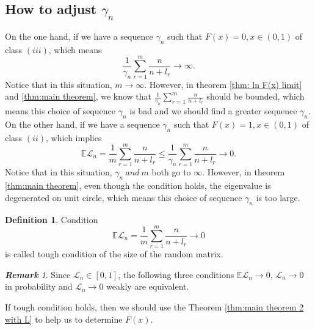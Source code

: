 \documentclass[12pt]{article}
\theoremstyle{plain}
\theoremstyle{definition}
\newtheorem{dfn}{\textbf{Definition}}
\theoremstyle{remark}
\newtheorem{rem}{\textbf{Remark}}
\begin{document}
\subsection*{How to adjust $\gamma_n$}
On the one hand, if we have a sequence $\gamma_{n}$ such that $F(x)=0,x\in(0,1)$ of class $(iii)$, which means
\begin{equation*}
\frac{1}{\gamma_{n}} \sum_{r=1}^{m} \frac{n}{n+l_{r}} \rightarrow \infty.
\end{equation*}
Notice that in this situation, $m\rightarrow \infty$.
However, in theorem \ref{thm: ln F(x) limit} and \ref{thm:main theorem}, we know that $\frac{1}{\gamma_{n}} \sum_{r=1}^{m} \frac{n}{n+l_{r}}$ should be bounded, which means this choice of sequence $\gamma_{n}$ is bad and we should find a greater sequence $\gamma_{n}$.\\
On the other hand, if we have a sequence $\gamma_{n}$ such that $F(x)=1,x\in(0,1)$ of class $(ii)$, which implies
\begin{equation*}
    \mathbb{E} \mathscr{L}_{n}=\frac{1}{m} \sum_{r=1}^{m} \frac{n}{n+l_{r}}\leq \frac{1}{\gamma_{n}} \sum_{r=1}^{m} \frac{n}{n+l_{r}} \rightarrow  0.
\end{equation*}
Notice that in this situation, $\gamma_{n}\ and\  m$ both go to $\infty$.
However, in theorem \ref{thm:main theorem}, even though the condition holds, the eigenvalue is degenerated on unit circle, which means this choice of sequence $\gamma_{n}$ is too large.

\begin{dfn}
    Condition
    \begin{equation*}
        \mathbb{E} \mathscr{L}_{n}=\frac{1}{m} \sum_{r=1}^{m} \frac{n}{n+l_{r}} \rightarrow 0
    \end{equation*}
    is called tough condition of the size of the random matrix.
\end{dfn}
\begin{rem}
    Since $\mathscr{L}_{n}\in [0,1]$, the following three conditions $\mathbb{E} \mathscr{L}_{n}\rightarrow 0$, $ \mathscr{L}_{n}\rightarrow 0$ in probability and $ \mathscr{L}_{n}\rightarrow 0$ weakly are equivalent.
\end{rem}
If tough condition holds, then we should use the Theorem \ref{thm:main theorem 2 with L} to help us to determine $F(x)$.



\end{document}
